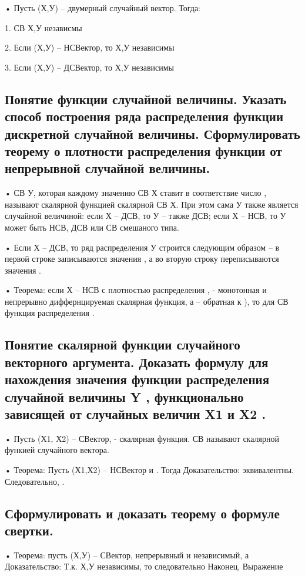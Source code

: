 • Пусть (Х,У) – двумерный случайный вектор. Тогда:

1. СВ Х,У независмы 

2. Если (Х,У) – НСВектор, то Х,У независимы 

3. Если (Х,У) – ДСВектор, то Х,У независимы 

\subsection{Понятие функции случайной величины. Указать способ построения ряда распределения функции дискретной случайной величины. Сформулировать теорему о плотности распределения функции от непрерывной случайной величины.}

• СВ У, которая каждому значению СВ Х ставит в соответствие число , называют скалярной функцией скалярной СВ Х. При этом сама У также является случайной величиной: если Х – ДСВ, то У – также ДСВ; если Х – НСВ, то У может быть НСВ, ДСВ или СВ смешаного типа.

• Если Х – ДСВ, то ряд распределения У строится следующим образом – в первой строке записываются значения , а во вторую строку переписываются значения .

• Теорема: если Х – НСВ с плотностью распределения ,   - монотонная и непрерывно диффернцируемая скалярная функция, а  – обратная к ), то для СВ  функция распределения .

\subsection{Понятие скалярной функции случайного векторного аргумента. Доказать формулу для нахождения значения функции распределения случайной величины Y , функционально зависящей от случайных величин X1 и X2 .}

• Пусть (Х1, Х2) – СВектор,  - скалярная функция. СВ  называют скалярной функией случайного вектора.

• Теорема: Пусть (Х1,Х2) – НСВектор и . Тогда 
Доказательство:  эквивалентны. Следовательно, .


\subsection{Сформулировать и доказать теорему о формуле свертки.}

• Теорема: пусть (Х,У) – СВектор, непрерывный и независимый, а 
Доказательство:  Т.к. Х,У независимы, то  следовательно 
Наконец, 
Выражение 



